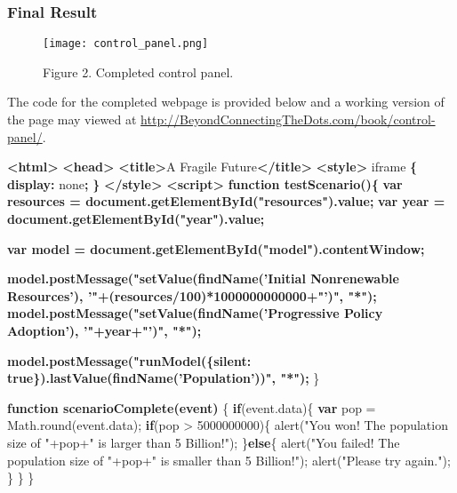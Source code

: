 \documentclass[]{memoir}
\makeatletter
\newenvironment{Shaded}{}{}
\newcommand{\KeywordTok}[1]{\textcolor[rgb]{0.00,0.44,0.13}{\textbf{{#1}}}}
\newcommand{\DataTypeTok}[1]{\textcolor[rgb]{0.56,0.13,0.00}{{#1}}}
\newcommand{\DecValTok}[1]{\textcolor[rgb]{0.25,0.63,0.44}{{#1}}}
\newcommand{\StringTok}[1]{\textcolor[rgb]{0.25,0.44,0.63}{{#1}}}
\newcommand{\OtherTok}[1]{\textcolor[rgb]{0.00,0.44,0.13}{{#1}}}
\newcommand{\FunctionTok}[1]{\textcolor[rgb]{0.02,0.16,0.49}{{#1}}}
\newcommand{\ErrorTok}[1]{\textcolor[rgb]{1.00,0.00,0.00}{\textbf{{#1}}}}
\newcommand{\NormalTok}[1]{{#1}}
\def\maxwidth{\ifdim\Gin@nat@width>\linewidth\linewidth
\else\Gin@nat@width\fi}
\let\Oldincludegraphics\includegraphics
\renewcommand{\includegraphics}[1]{\Oldincludegraphics[width=\maxwidth]{#1}}
\makeatother
\begin{document}
\subsubsection{Final Result}

\begin{figure}[htbp]
\centering
\texttt{[image: control\_panel.png]}
\caption{Figure 2. Completed control panel.}
\end{figure}

The code for the completed webpage is provided below and a working
version of the page may viewed at
\url{http://BeyondConnectingTheDots.com/book/control-panel/}.

\begin{Shaded}
\begin{Highlighting}[]
\KeywordTok{<html>}
\KeywordTok{<head>}
    \KeywordTok{<title>}\NormalTok{A Fragile Future}\KeywordTok{</title>}
    \KeywordTok{<style>}
        \NormalTok{iframe }\KeywordTok{\{}
            \KeywordTok{display:} \DataTypeTok{none}\KeywordTok{;}
        \KeywordTok{\}}
    \KeywordTok{</style>}
    \KeywordTok{<script>}
\ErrorTok{    function testScenario()\{}
\ErrorTok{        var resources = document.getElementById("resources").value;}
\ErrorTok{        var year = document.getElementById("year").value;}
        
\ErrorTok{        var model = document.getElementById("model").contentWindow;}

\ErrorTok{        model.postMessage("setValue(findName('Initial Nonrenewable Resources'), '"+(resources/100)*1000000000000+"')", "*");}
\ErrorTok{        model.postMessage("setValue(findName('Progressive Policy Adoption'), '"+year+"')", "*");}
        
\ErrorTok{        model.postMessage("runModel(\{silent: true\}).lastValue(findName('Population'))", "*");}
    \NormalTok{\}}
    
\ErrorTok{    function scenarioComplete(event)}
    \NormalTok{\{}
        \KeywordTok{if}\NormalTok{(}\OtherTok{event}\NormalTok{.}\FunctionTok{data}\NormalTok{)\{}
            \KeywordTok{var} \NormalTok{pop = }\OtherTok{Math}\NormalTok{.}\FunctionTok{round}\NormalTok{(}\OtherTok{event}\NormalTok{.}\FunctionTok{data}\NormalTok{);}
            \KeywordTok{if}\NormalTok{(pop > }\DecValTok{5000000000}\NormalTok{)\{}
                \FunctionTok{alert}\NormalTok{(}\StringTok{"You won! The population size of "}\NormalTok{+pop+}\StringTok{" is larger than 5 Billion!"}\NormalTok{);}
            \NormalTok{\}}\KeywordTok{else}\NormalTok{\{}
                \FunctionTok{alert}\NormalTok{(}\StringTok{"You failed! The population size of "}\NormalTok{+pop+}\StringTok{" is smaller than 5 Billion!"}\NormalTok{);}
                \FunctionTok{alert}\NormalTok{(}\StringTok{"Please try again."}\NormalTok{);}
            \NormalTok{\}}
        \NormalTok{\}}
    \NormalTok{\}}


\end{Highlighting}
\end{Shaded}
\end{document}
